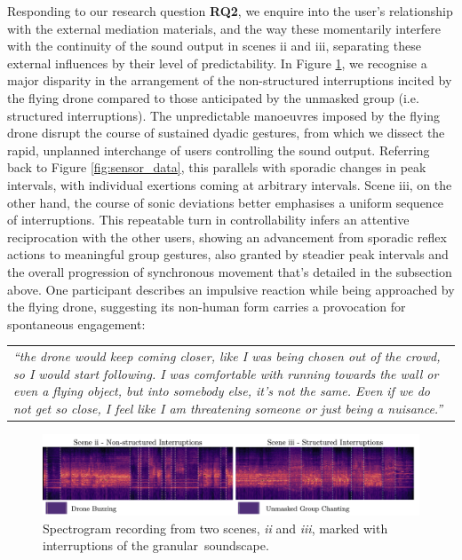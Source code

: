 Responding to our research question \textbf{RQ2}, we enquire into the user's relationship with the external mediation materials, and the way these momentarily interfere with the continuity of the sound output in scenes ii and iii, separating these external influences by their level of predictability. In Figure \ref{fig:interuptions-spectogram}, we recognise a major disparity in the arrangement of the non-structured interruptions incited by the flying drone compared to those anticipated by the unmasked group (i.e. structured interruptions). The unpredictable manoeuvres imposed by the flying drone disrupt the course of sustained dyadic gestures, from which we dissect the rapid, unplanned interchange of users controlling the sound output. Referring back to Figure \ref{fig:sensor_data}, this parallels with sporadic changes in peak intervals, with individual exertions coming at arbitrary intervals. Scene iii, on the other hand, the course of sonic deviations better emphasises a uniform sequence of interruptions. This repeatable turn in controllability infers an attentive reciprocation with the other users, showing an advancement from sporadic reflex actions to meaningful group gestures, also granted by steadier peak intervals and the overall progression of synchronous movement that's detailed in the subsection above. One participant describes an impulsive reaction while being approached by the flying drone, suggesting its non-human form carries a provocation for spontaneous engagement:

\begin{center}
\begin{tabular}{ p{13cm}}
\textit{``the drone would keep coming closer, like I was being chosen out of the crowd, so I would start following. I was comfortable with running towards the wall or even a flying object, but into somebody else, it's not the same. Even if we do not get so close, I feel like I am threatening someone or just being a nuisance.''}
\end{tabular}
\end{center}

\begin{figure}
\centering
\includegraphics[width=\textwidth,keepaspectratio]{Chapters/Figures/adse_ess/interuptions-spectogram-markings-fig.png}
{\caption[Spectrogram recording from two scenes, \textit{ii} and \textit{iii}]{Spectrogram recording from two scenes, \textit{ii} and \textit{iii}, marked with interruptions of the granular~soundscape.}
\label{fig:interuptions-spectogram}}
\end{figure}

